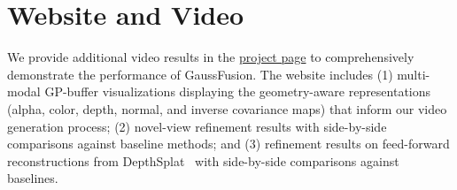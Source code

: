 \clearpage

\setcounter{page}{1}
\setcounter{section}{0}
\renewcommand{\thesection}{\Alph{section}} %
\maketitlesupplementary
\begin{abstract}
    We provide additional details in the following:
\begin{enumerate}
    \item A website including additional video results (\cref{supp:website}).
    \item Implementation details of \ours, including more training details and model architecture (\cref{supp:implementation}).
    \item Additional details on training data generation (\cref{supp:training_data}).
    \item Finetuning strategies (GA vs DiT) (\cref{supp:finetuning}).
    \item Multi-modal encoding using RGB Video VAE (\cref{supp:vae_encoding}).
    \item Analysis of different 3DGS artifacts
    (\cref{supp:3dgs_artifact}).
    \item Comparison of refinement and direction Generation
    (\cref{supp:refinement_vs_generation}).
    \item Additional qualitative results (\cref{supp:add_results}).
    \item Limitations and future work (\cref{supp:limitations}).
\end{enumerate}
\end{abstract}

\section{Website and Video}
\label{supp:website}
We provide additional video results in the \href{http://research.zhuliyuan.net/projects/GaussFusion/}{project page} to comprehensively demonstrate the performance of GaussFusion. The website includes (1) multi-modal GP-buffer visualizations displaying the geometry-aware representations (alpha, color, depth, normal, and inverse covariance maps) that inform our video generation process; (2) novel-view refinement results with side-by-side comparisons against baseline methods; and (3) refinement results on feed-forward reconstructions from DepthSplat~\cite{xu2024depthsplat} with side-by-side comparisons against baselines.


